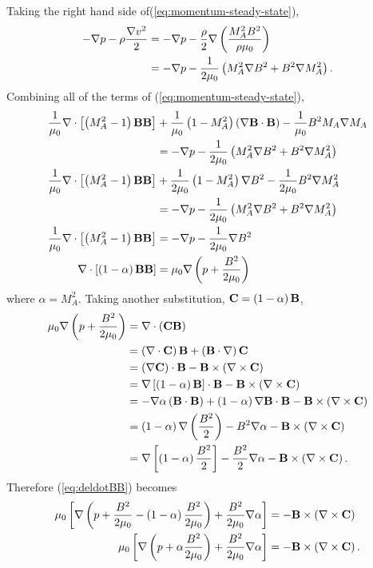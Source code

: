 Taking the right hand side of(\ref{eq:momentum-steady-state}), 
\[
\begin{split}
    -\nabla p -\rho\frac{\nabla v^2}{2} &= -\nabla p -\frac{\rho}{2}\nabla\left( \frac{M_A^2 B^2}{\rho\mu_0} \right) \\
    &= -\nabla p - \frac{1}{2\mu_0}\left( M_A^2 \nabla B^2 + B^2\nabla M_A^2 \right). \\
\end{split}
\]
Combining all of the terms of (\ref{eq:momentum-steady-state}),
\begin{equation}
    \begin{split}
        \frac{1}{\mu_0}\nabla \cdot\left[ \left( M_A^2-1 \right)\mathbf{B}\mathbf{B} \right] &+ \frac{1}{\mu_0}\left( 1-M_A^2 \right)\left( \nabla\mathbf{B}\cdot\mathbf{B} \right) - \frac{1}{\mu_0}B^2 M_A\nabla M_A \\
        &= -\nabla p - \frac{1}{2\mu_0}\left( M_A^2 \nabla B^2 + B^2\nabla M_A^2 \right) \\
        \frac{1}{\mu_0}\nabla \cdot\left[ \left( M_A^2-1 \right)\mathbf{B}\mathbf{B} \right] &+ \frac{1}{2\mu_0}\left( 1-M_A^2 \right)\nabla B^2 - \frac{1}{2\mu_0}B^2\nabla M_A^2 \\
        &= -\nabla p - \frac{1}{2\mu_0}\left( M_A^2 \nabla B^2 + B^2\nabla M_A^2 \right) \\
        \frac{1}{\mu_0}\nabla \cdot\left[ \left( M_A^2-1 \right)\mathbf{B}\mathbf{B} \right] &= - \nabla p -\frac{1}{2\mu_0}\nabla B^2 \\
        \nabla \cdot\left[ \left( 1-\alpha \right)\mathbf{B}\mathbf{B} \right] &= \mu_0\nabla\left( p + \frac{B^2}{2\mu_0} \right) \\
    \end{split}
    \label{eq:deldotBB}
\end{equation}
where $\alpha=M_A^2$. Taking another substitution, $\mathbf{C} = \left( 1-\alpha \right)\mathbf{B}$,
\[
\begin{split}
    \mu_0\nabla\left( p + \frac{B^2}{2\mu_0} \right) &= \nabla \cdot\left( \mathbf{C}\mathbf{B} \right) \\
    &= \left( \nabla \cdot\mathbf{C} \right)\mathbf{B} + \left( \mathbf{B}\cdot\nabla \right)\mathbf{C} \\
    &= \left( \nabla \mathbf{C} \right)\cdot\mathbf{B} - \mathbf{B}\times\left( \nabla \times \mathbf{C} \right) \\
    &= \nabla\left[ \left( 1-\alpha \right)\mathbf{B} \right]\cdot\mathbf{B} - \mathbf{B}\times\left( \nabla \times \mathbf{C} \right) \\
    &= -\nabla\alpha\left( \mathbf{B}\cdot\mathbf{B} \right) + \left( 1-\alpha \right)\nabla\mathbf{B}\cdot\mathbf{B} - \mathbf{B}\times\left( \nabla \times \mathbf{C} \right) \\
    &= \left( 1-\alpha \right)\nabla\left( \frac{B^2}{2} \right) - B^2\nabla\alpha - \mathbf{B}\times\left( \nabla \times \mathbf{C} \right) \\
    &= \nabla\left[ \left( 1-\alpha \right)\frac{B^2}{2} \right] - \frac{B^2}{2}\nabla\alpha - \mathbf{B}\times\left( \nabla \times \mathbf{C} \right). \\
\end{split}
\]
Therefore (\ref{eq:deldotBB}) becomes
\begin{equation}
    \begin{split}
        \mu_0\left[ \nabla\left( p + \frac{B^2}{2\mu_0} - \left( 1-\alpha \right)\frac{B^2}{2\mu_0} \right) + \frac{B^2}{2\mu_0}\nabla\alpha \right] &= -\mathbf{B}\times\left( \nabla \times \mathbf{C} \right) \\
        \mu_0\left[ \nabla\left( p + \alpha\frac{B^2}{2\mu_0} \right) + \frac{B^2}{2\mu_0}\nabla\alpha \right] &= -\mathbf{B}\times\left( \nabla \times \mathbf{C} \right). \\
    \end{split}
\end{equation}

